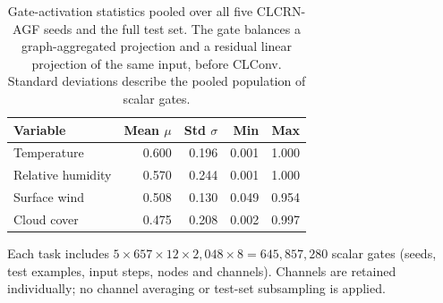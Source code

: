 \begin{table}[htbp]
\caption{Gate-activation statistics pooled over all five CLCRN-AGF seeds and the full test set. The gate balances a graph-aggregated projection and a residual linear projection of the same input, before CLConv. Standard deviations describe the pooled population of scalar gates.}
\label{tab:gate}
\centering
\small
\begin{tabular}{lrrrr}
\toprule
Variable & Mean $\mu$ & Std $\sigma$ & Min & Max\\
\midrule
Temperature & 0.600 & 0.196 & 0.001 & 1.000 \\
Relative humidity & 0.570 & 0.244 & 0.001 & 1.000 \\
Surface wind & 0.508 & 0.130 & 0.049 & 0.954 \\
Cloud cover & 0.475 & 0.208 & 0.002 & 0.997 \\
\bottomrule
\end{tabular}
\vspace{2pt}\par\parbox{\linewidth}{\footnotesize Each task includes $5\times657\times12\times2{,}048\times8=645{,}857{,}280$ scalar gates (seeds, test examples, input steps, nodes and channels). Channels are retained individually; no channel averaging or test-set subsampling is applied.}
\end{table}

